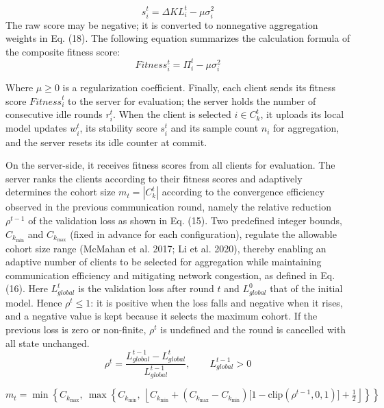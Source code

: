 \documentclass[pdflatex,sn-mathphys-num,oneside]{sn-jnl}%
\theoremstyle{thmstyleone}%
\theoremstyle{thmstyletwo}%
\theoremstyle{thmstylethree}%
\begin{document}
\begin{equation}
s_i^t = \Delta KL_i^t - \mu \sigma_i^2
\label{eq:stability}
\end{equation}
The raw score may be negative; it is converted to nonnegative aggregation weights in Eq. (18). The following equation summarizes the calculation formula of the composite fitness score:
\begin{equation}
Fitness_i^t = \Pi_i^t - \mu \sigma_i^2
\label{eq:fitness}
\end{equation}

Where $\mu \ge 0$ is a regularization coefficient. Finally, each client sends its fitness score ${Fitness}_i^t$ to the server for evaluation; the server holds the number of consecutive idle rounds $r_i^t$. When the client is selected $i\in C_k^t$, it uploads its local model updates $w_i^t$, its stability score $s_i^t$ and its sample count $n_i$ for aggregation, and the server resets its idle counter at commit.

On the server-side, it receives fitness scores from all clients for evaluation. The server ranks the clients according to their fitness scores and adaptively determines the cohort size $m_t=|C_k^t|$ according to the convergence efficiency observed in the previous communication round, namely the relative reduction $\rho^{t-1}$ of the validation loss as shown in Eq. (15). Two predefined integer bounds, $C_{k_{\min}}$ and $C_{k_{\max}}$ (fixed in advance for each configuration), regulate the allowable cohort size range (McMahan et al. 2017; Li et al. 2020), thereby enabling an adaptive number of clients to be selected for aggregation while maintaining communication efficiency and mitigating network congestion, as defined in Eq. (16). Here $L_{global}^{t}$ is the validation loss after round $t$ and $L_{global}^{0}$ that of the initial model. Hence $\rho^{t}\le 1$: it is positive when the loss falls and negative when it rises, and a negative value is kept because it selects the maximum cohort. If the previous loss is zero or non-finite, $\rho^{t}$ is undefined and the round is cancelled with all state unchanged.
\begin{equation}
\rho^{t} = \frac{L_{{global}}^{t-1} - L_{{global}}^{t}}{L_{{global}}^{t-1}},\qquad L_{{global}}^{t-1}>0
\label{eq:convergence}
\end{equation}

\begin{equation}
m_t = \min\left\{C_{k_{\max}},\ \max\left\{C_{k_{\min}},\ \left\lfloor C_{k_{\min}} + (C_{k_{\max}} - C_{k_{\min}})\big[1-\mathrm{clip}(\rho^{t-1},0,1)\big] + \tfrac{1}{2}\right\rfloor\right\}\right\}
\label{eq:ck_selection}
\end{equation}
\end{document}
